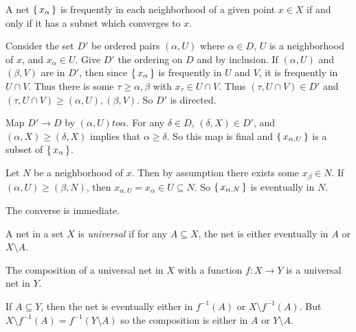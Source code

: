 \documentclass[letterpaper, 11pt]{article}
\begin{document}
\begin{prop}
  A net $\set{x_{\alpha}}$ is frequently in each neighborhood of a given point $x \in X$ if and only if it has a subnet which converges to $x$.
\end{prop}
\begin{pf}
  Consider the set $D'$ be ordered pairs $(\alpha, U)$ where $\alpha \in D$, $U$ is a neighborhood of $x$, and $x_{\alpha} \in U$.
  Give $D'$ the ordering on $D$ and by inclusion.
  If $(\alpha, U)$ and $(\beta, V)$ are in $D'$, then since $\set{x_{\alpha}}$ is frequently in $U$ and $V$, it is frequently in $U \cap V$.
  Thus there is some $\tau \geq \alpha, \beta$ with $x_{\tau} \in U \cap V$.
  Thus $(\tau, U \cap V) \in D'$ and $(\tau, U \cap V) \geq (\alpha, U), (\beta, V)$.
  So $D'$ is directed.

  Map $D' \to D$ by $(\alpha, U) to \alpha$.
  For any $\delta \in D$, $(\delta, X) \in D'$, and $(\alpha, X) \geq (\delta, X)$ implies that $\alpha \geq \delta$.
  So this map is final and $\set{x_{\alpha, U}}$ is a subset of $\set{x_{\alpha}}$.

  Let $N$ be a neighborhood of $x$.
  Then by assumption there exists some $x_{\beta} \in N$.
  If $(\alpha, U) \geq (\beta, N)$, then $x_{\alpha, U} = x_{\alpha} \in U \subseteq N$.
  So $\set{x_{\alpha, N}}$ is eventually in $N$.

  The converse is immediate.
\end{pf}

\begin{defn}
  A net in a set $X$ is \emph{universal} if for any $A \subseteq X$, the net is either eventually in $A$ or $X \setminus A$.
\end{defn}

\begin{prop}\label{prop: composition_with_universal_is_universal}
  The composition of a universal net in $X$ with a function $f\colon X \to Y$ is a universal net in $Y$.
\end{prop}
\begin{pf}
  If $A \subseteq Y$, then the net is eventually either in $f^{-1}(A)$ or $X \setminus f^{-1}(A)$.
  But $X \setminus f^{-1}(A) = f^{-1}(Y \setminus A)$ so the composition is either in $A$ or $Y \setminus A$.
\end{pf}

\clearpage
\end{document}
